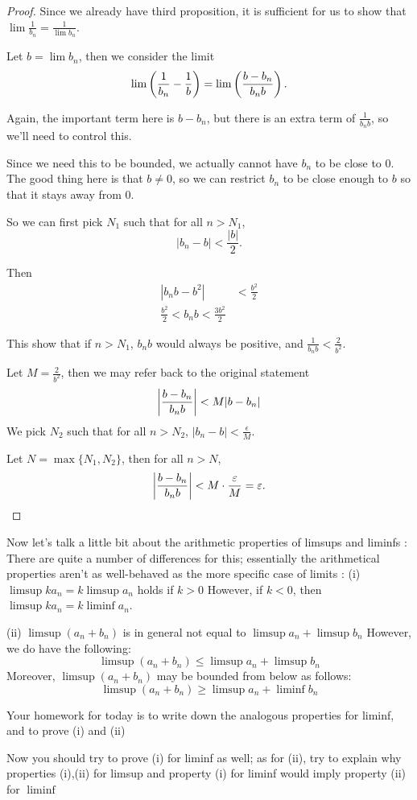 \begin{proof}
Since we already have third proposition, it is sufficient for us to show that $\lim\frac{1}{b_n}=\frac{1}{\lim b_n}$.

Let $b=\lim b_n$, then we consider the limit
\[ \lim\left(\frac{1}{b_n}-\frac{1}{b}\right)=\lim\left(\frac{b-b_n}{b_nb}\right). \]

Again, the important term here is $b-b_n$, but there is an extra term of $\frac{1}{b_nb}$, so we'll need to control this.

Since we need this to be bounded, we actually cannot have $b_n$ to be close to $0$. The good thing here is that $b\neq0$, so we can restrict $b_n$ to be close enough to $b$ so that it stays away from $0$.

So we can first pick $N_1$ such that for all $n>N_1$,
\[ |b_n-b|<\frac{|b|}{2}. \]

Then
\begin{align*}
|b_nb-b^2|&<\frac{b^2}{2}\\
\frac{b^2}{2}<b_nb<\frac{3b^2}{2}
\end{align*}

This show that if $n>N_1$, $b_nb$ would always be positive, and $\frac{1}{b_nb}<\frac{2}{b^2}$.

Let $M=\frac{2}{b^2}$, then we may refer back to the original statement
\[ \left|\frac{b-b_n}{b_nb}\right|<M|b-b_n| \]
We pick $N_2$ such that for all $n>N_2$, $|b_n-b|<\frac{\epsilon}{M}$.

Let $N=\max\{N_1,N_2\}$, then for all $n>N$,
\[ \left|\frac{b-b_n}{b_nb}\right|<M\cdot\frac{\varepsilon}{M}=\varepsilon. \]
\end{proof}

Now let's talk a little bit about the arithmetic properties of limsups and liminfs
:
There are quite a number of differences for this; essentially the arithmetical properties aren't as well-behaved as the more specific case of limits
:
(i) $\limsup ka_n = k \limsup a_n$ holds if $k>0$
However, if $k<0$, then $\limsup ka_n = k \liminf a_n$.

(ii) $\limsup(a_n+b_n)$ is in general not equal to $\limsup a_n + \limsup b_n$
However, we do have the following:
\[ \limsup(a_n+b_n)\le\limsup a_n+\limsup b_n \]
Moreover, $\limsup(a_n+b_n)$ may be bounded from below as follows:
\[ \limsup(a_n+b_n)\ge\limsup a_n+\liminf b_n \]

Your homework for today is to write down the analogous properties for liminf, and to prove (i) and (ii)

Now you should try to prove (i) for liminf as well; as for (ii), try to explain why properties (i),(ii) for limsup and property (i) for liminf would imply property (ii) for $\liminf$

